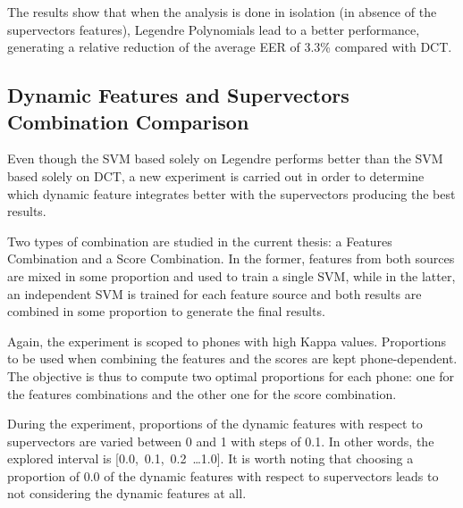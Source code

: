 The results show that when the analysis is done in isolation (in absence of the supervectors
features), Legendre Polynomials lead to a better performance, generating a relative reduction
of the average EER of 3.3\% compared with DCT.

\subsection{Dynamic Features and Supervectors Combination Comparison}

Even though the SVM based solely on Legendre performs better than the SVM based solely on
DCT, a new experiment is carried out in order to determine which
dynamic feature integrates better
with the supervectors producing the best results.

Two types of combination are studied in the current thesis: a Features Combination and a Score
Combination. In the former, features from both sources are mixed in some proportion and
used to train a single SVM, while in the latter,
an independent SVM is trained for each feature source and
both results are combined in some proportion to generate the final results.

Again, the experiment is scoped to phones with high Kappa values.
Proportions to be used when combining the features and the scores are kept phone-dependent.
The objective is thus to compute two optimal proportions for each phone:
one for the features combinations and the other one for the score combination.

During the experiment, proportions of the dynamic features with respect to supervectors
are varied between 0 and 1 with steps of 0.1.
In other words, the explored interval is
\mbox{[0.0, 0.1, 0.2 \ldots 1.0]}.
It is worth noting that choosing
a proportion of 0.0 of the dynamic
features with respect to supervectors leads to not considering the dynamic features at all.


